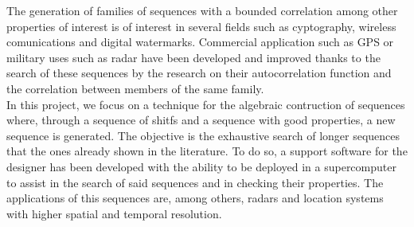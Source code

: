 The generation of families of sequences with a bounded correlation among other
properties of interest is of interest in several fields such as cyptography,
wireless comunications and digital watermarks. Commercial application such as
GPS or military uses such as radar have been developed and improved thanks to
the search of these sequences by the research on their autocorrelation function
and the correlation between members of the same family.\\

In this project, we focus on a technique for the algebraic contruction of
sequences where, through a sequence of shitfs and a sequence with good
properties, a new sequence is generated. The objective is the exhaustive
search of longer sequences that the ones already shown in the literature.
To do so, a support software for the designer has been developed with the
ability to be deployed in a supercomputer to assist in the search of said
sequences and in checking their properties. The applications of this sequences
are, among others, radars and location systems with higher spatial and temporal
resolution.
